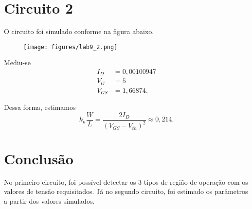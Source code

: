 \documentclass[a4paper]{report}
\begin{document}
\section*{Circuito 2}

O circuito foi simulado conforme na figura abaixo.

\begin{figure}[H]
    \centering
    \texttt{[image: figures/lab9\_2.png]}
\end{figure}

Mediu-se
\begin{align*}
    I_D &= 0,00100947 \\
    V_G &= 5 \\
    V_{GS} &= 1,66874
.\end{align*}

Dessa forma, estimamos \[
k_n \frac{W}{L} = \frac{2I_D}{\left( V_{GS}-V_{th} \right)^2 } \approx 0,214
.\] 


\section{Conclusão}

No primeiro circuito, foi possível detectar os 3 tipos de região de operação com os valores de tensão requisitados. Já no segundo circuito, foi estimado os parâmetros a partir dos valores simulados. 
\end{document}
